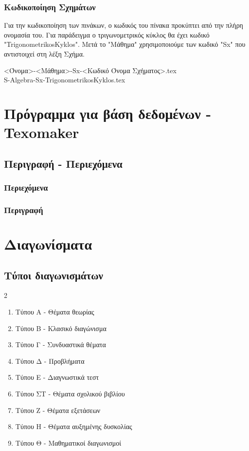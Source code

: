 \documentclass[11pt,a4paper]{book}
\newcommand{\xr}[1]{\textcolor{red!80!black}{#1}}
\begin{document}
\subsection{Κωδικοποίηση Σχημάτων}
Για την κωδικοποίηση των πινάκων, ο κωδικός του πίνακα προκύπτει από την πλήρη ονομασία του. Για παράδειγμα ο τριγωνομετρικός κύκλος θα έχει κωδικό "\xr{TrigonometrikosKyklos}". Μετά το "Μάθημα" χρησιμοποιούμε των κωδικό "\xr{Sx}" που αντιστοιχεί στη λέξη Σχήμα.
\begin{center}
<Όνομα>-<Μάθημα>-Sx-<Κωδικό Όνομα Σχήματος>.tex\\
\xr{S}-Algebra-\xr{Sx}-TrigonometrikosKyklos.tex
\end{center}
\chapter{Πρόγραμμα για βάση δεδομένων - Texomaker}
\section{Περιγραφή - Περιεχόμενα}
\subsection{Περιεχόμενα}

\subsection{Περιγραφή}
\chapter{Διαγωνίσματα}
\section{Τύποι διαγωνισμάτων}
\begin{multicols}{2}
\begin{enumerate}[itemsep=0mm]
\item Τύπου Α - Θέματα θεωρίας
\item Τύπου Β - Κλασικό διαγώνισμα
\item Τύπου Γ - Συνδυαστικά θέματα
\item Τύπου Δ - Προβλήματα
\item Τύπου Ε - Διαγνωστικά τεστ
\item Τύπου ΣΤ - Θέματα σχολικού βιβλίου
\item Τύπου Ζ - Θέματα εξετάσεων
\item Τύπου Η - Θέματα αυξημένης δυσκολίας
\item Τύπου Θ - Μαθηματικοί διαγωνισμοί
\end{enumerate}
\end{multicols}
\end{document}
